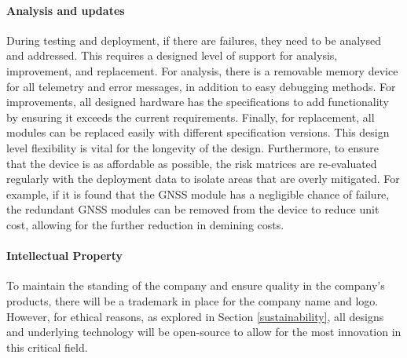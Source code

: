\paragraph{Analysis and updates}
During testing and deployment, if there are failures, they need to be analysed and addressed. This requires a designed level of support for analysis, improvement, and replacement. For analysis, there is a removable memory device for all telemetry and error messages, in addition to easy debugging methods. For improvements, all designed hardware has the specifications to add functionality by ensuring it exceeds the current requirements. Finally, for replacement, all modules can be replaced easily with different specification versions. This design level flexibility is vital for the longevity of the design. Furthermore, to ensure that the device is as affordable as possible, the risk matrices are re-evaluated regularly with the deployment data to isolate areas that are overly mitigated. For example, if it is found that the \gls{GNSS} module has a negligible chance of failure, the redundant \gls{GNSS} modules can be removed from the device to reduce unit cost, allowing for the further reduction in demining costs.
\paragraph{Intellectual Property}
 To maintain the standing of the company and ensure quality in the company's products, there will be a trademark in place for the company name and logo. However, for ethical reasons, as explored in Section \ref{sustainability}, all designs and underlying technology will be open-source to allow for the most innovation in this critical field.